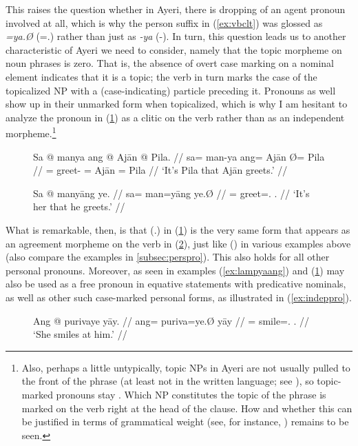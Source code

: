 This raises the question whether in Ayeri, there is dropping of an agent
pronoun involved at all, which is why the person suffix in (\ref{ex:vbclt}) was
glossed as \emph{=ya.Ø} (\mbox{=\TsgM{}.\Top{}}) rather than just as \emph{-ya}
(-\TsgM{}). In turn, this question leads us to another characteristic of Ayeri
we need to consider, namely that the topic morpheme on noun phrases is zero.
That is, the absence of overt case marking on a nominal element indicates that
it is a topic; the verb in turn marks the case of the topicalized NP with a
(case-indicating) particle preceding it. Pronouns as well show up in their
unmarked form when topicalized, which is why I am hesitant to analyze the
pronoun in (\ref{ex:protop}) as a clitic on the verb rather than as an
independent morpheme.\footnote{Also, perhaps a little untypically, topic NPs in
Ayeri are not usually pulled to the front of the phrase (at least not in the
written language; see \cite[120--122]{lehmann2015}), so topic-marked pronouns
stay . Which NP constitutes the topic of the phrase is marked on
the verb right at the head of the clause. How and whether this can be justified
in terms of grammatical weight (see, for instance, \cite[95--98]{wasow1997})
remains to be seen.}

\begin{figure}[h]
\pex %
\a\label{ex:fullsntc}\begingl
	\gla Sa @ manya ang @ Ajān {} @ Pila. //
	\glb sa= man-ya ang= ​Ajān Ø= ​Pila //
	\glc \PatT{}= greet-\TsgM{} \Aarg{}= ​Ajān \Top{}= ​Pila //
	\glft `It's Pila that Ajān greets.' //
\endgl

\a\label{ex:protop}\begingl
	\gla Sa @ manyāng ye. //
	\glb sa= man=yāng ye.Ø //
	\glc \PatT{}= greet=\TsgM{}.\Aarg{} \TsgF{}.\Top{} //
	\glft `It's her that he greets.' //
\endgl
\xe
\end{figure}

What is remarkable, then, is that  (\TsgF{}.\Top{}) in
(\ref{ex:protop}) is the very same form that appears as an agreement morpheme
on the verb in (\ref{ex:ayrpronagr}), just like  (\TsgM{}) in
various examples above (also compare the examples in \autoref{subsec:perspro}).
This also holds for all other personal pronouns. Moreover, 
 as seen in examples (\ref{ex:lampyaang}) and 
(\ref{ex:protop}) may also be used as a free pronoun in equative statements
with predicative nominals, as well as other such case-marked personal forms, as
illustrated in (\ref{ex:indeppro}).

\begin{figure}[h]
\ex\label{ex:ayrpronagr} %
\begingl
	\gla Ang @ purivaye yāy. //
	\glb ang= puriva=ye.Ø yāy //
	\glc \AgtT{}= smile=\TsgF{}.\Top{} \TsgM{}.\Loc{} //
	\glft `She smiles at him.' //
\endgl\xe
\end{figure}

